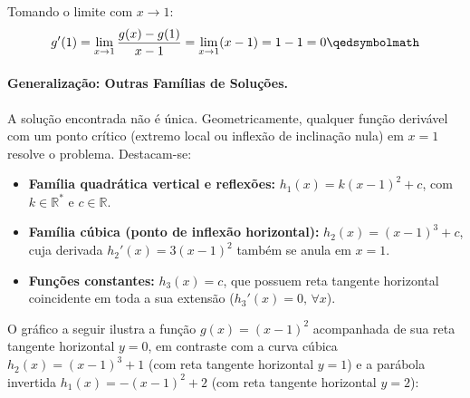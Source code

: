Tomando o limite com $x \to 1$:
\begin{equation}
g'(1) = \lim_{x \to 1} \frac{g(x) - g(1)}{x - 1} = \lim_{x \to 1}(x - 1) = 1 - 1 = 0 \qedsymbolmath
\end{equation}

\vspace{0.3cm}
\paragraph{Generalização: Outras Famílias de Soluções.}

A solução encontrada não é única. Geometricamente, qualquer função derivável com um ponto crítico (extremo local ou inflexão de inclinação nula) em $x = 1$ resolve o problema. Destacam-se:
\begin{itemize}[noitemsep, topsep=2pt]
    \item \textbf{Família quadrática vertical e reflexões:} $h_1(x) = k(x - 1)^2 + c$, com $k \in \mathbb{R}^*$ e $c \in \mathbb{R}$.
    \item \textbf{Família cúbica (ponto de inflexão horizontal):} $h_2(x) = (x - 1)^3 + c$, cuja derivada $h_2'(x) = 3(x - 1)^2$ também se anula em $x = 1$.
    \item \textbf{Funções constantes:} $h_3(x) = c$, que possuem reta tangente horizontal coincidente em toda a sua extensão ($h_3'(x) = 0, \, \forall x$).
\end{itemize}

O gráfico a seguir ilustra a função $g(x) = (x - 1)^2$ acompanhada de sua reta tangente horizontal $y = 0$, em contraste com a curva cúbica $h_2(x) = (x - 1)^3 + 1$ (com reta tangente horizontal $y = 1$) e a parábola invertida $h_1(x) = -(x - 1)^2 + 2$ (com reta tangente horizontal $y = 2$):

